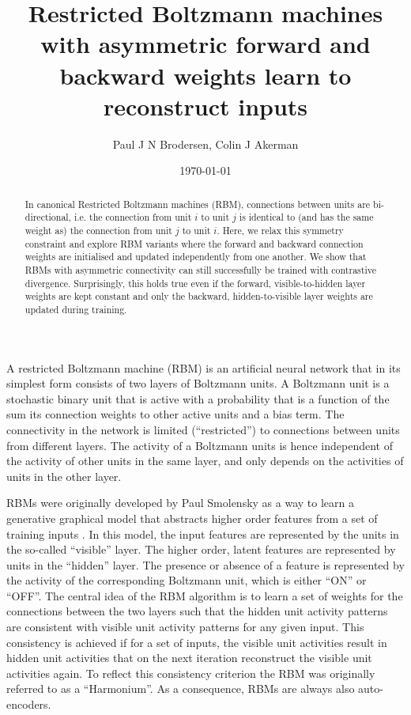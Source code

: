 \documentclass[11pt]{article}
\author{Paul J N Brodersen, Colin J Akerman}
\date{\today}
\title{Restricted Boltzmann machines with asymmetric forward and backward weights learn to reconstruct inputs}
\begin{document}
\maketitle

\begin{abstract}
In canonical Restricted Boltzmann machines (RBM), connections between
units are bi-directional, i.e. the connection from unit $i$ to unit
$j$ is identical to (and has the same weight as) the connection from
unit $j$ to unit $i$. Here, we relax this symmetry constraint and
explore RBM variants where the forward and backward connection weights
are initialised and updated independently from one another. We show
that RBMs with asymmetric connectivity can still successfully be
trained with contrastive divergence. Surprisingly, this holds true
even if the forward, visible-to-hidden layer weights are kept constant
and only the backward, hidden-to-visible layer weights are updated
during training.
\end{abstract}

A restricted Boltzmann machine (RBM) is an artificial neural network
that in its simplest form consists of two layers of Boltzmann units.
A Boltzmann unit is a stochastic binary unit that is active with a
probability that is a function of the sum its connection weights to
other active units and a bias term. The connectivity in the network
is limited (``restricted'') to connections between units from different
layers. The activity of a Boltzmann units is hence independent of the
activity of other units in the same layer, and only depends on the
activities of units in the other layer.

RBMs were originally developed by Paul Smolensky as a way to learn a
generative graphical model that abstracts higher order features from a
set of training inputs \citep{Smolensky1986a}. In this model, the input
features are represented by the units in the so-called ``visible''
layer. The higher order, latent features are represented by units in
the ``hidden'' layer. The presence or absence of a feature is
represented by the activity of the corresponding Boltzmann unit, which
is either ``ON'' or ``OFF''. The central idea of the RBM algorithm is
to learn a set of weights for the connections between the two layers
such that the hidden unit activity patterns are consistent with
visible unit activity patterns for any given input. This consistency
is achieved if for a set of inputs, the visible unit activities result
in hidden unit activities that on the next iteration reconstruct the
visible unit activities again. To reflect this consistency criterion
the RBM was originally referred to as a ``Harmonium''. As a
consequence, RBMs are always also auto-encoders.
\end{document}
